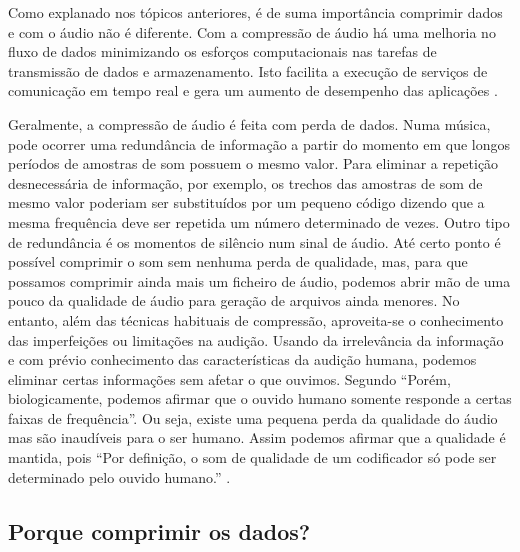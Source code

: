 Como explanado nos tópicos anteriores, é de suma importância comprimir dados e com o áudio não é diferente. Com a compressão de áudio há uma melhoria no fluxo de dados minimizando os esforços computacionais nas tarefas de transmissão de dados e armazenamento. Isto facilita a execução de serviços de comunicação em tempo real e gera um aumento de desempenho das aplicações \cite{compressaoaudio}.

Geralmente, a compressão de áudio é feita com perda de dados. Numa música, pode ocorrer uma redundância de informação a partir do momento em que longos períodos de amostras de som possuem o mesmo valor. Para eliminar a repetição desnecessária de informação, por exemplo, os trechos das amostras de som de mesmo valor poderiam ser substituídos por um pequeno código dizendo que a mesma frequência deve ser repetida um número determinado de vezes. Outro tipo de redundância é os momentos de silêncio num sinal de áudio. Até certo ponto é possível comprimir o som sem nenhuma perda de qualidade, mas, para que possamos comprimir ainda mais um ficheiro de áudio, podemos abrir mão de uma pouco da qualidade de áudio para geração de arquivos ainda menores. No entanto, além das técnicas habituais de compressão, aproveita-se o conhecimento das imperfeições ou limitações na audição. Usando da irrelevância da informação e com prévio conhecimento das características da audição humana, podemos eliminar certas informações sem afetar o que ouvimos. Segundo \cite{compressaoaudio} ``Porém, biologicamente, podemos afirmar que o ouvido humano somente responde a certas faixas de frequência''. Ou seja, existe uma pequena perda da qualidade do áudio mas são inaudíveis para o ser humano. Assim podemos afirmar que a qualidade é mantida, pois ``Por definição, o som de qualidade de um codificador só pode ser determinado pelo ouvido humano.'' \cite{compressaoaudio}.

\subsection{Porque comprimir os dados?}

